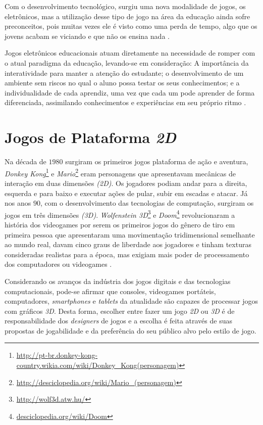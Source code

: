 Com o desenvolvimento tecnológico, surgiu uma nova modalidade de jogos, os eletrônicos, mas a utilização desse tipo de jogo na área da educação ainda sofre preconceitos, pois muitas vezes ele é visto como uma perda de tempo, algo que os jovens acabam se viciando e que não os ensina nada \cite{bib:medeiros2012}.

Jogos eletrônicos educacionais atuam diretamente na necessidade de romper com o atual paradigma da educação, levando-se em consideração: A importância da interatividade para manter a atenção do estudante; o desenvolvimento de um ambiente sem riscos no qual o aluno possa testar os seus conhecimentos; e a individualidade de cada aprendiz, uma vez que cada um pode aprender de forma diferenciada, assimilando conhecimentos e experiências em seu próprio ritmo \cite{bib:medeiros2012}.

\section{Jogos de Plataforma \textit{2D}}
\label{sec:plataforma2D}

Na década de $1980$ surgiram os primeiros jogos plataforma de ação e aventura, \textit{Donkey Kong}\footnote{\url{http://pt-br.donkey-kong-country.wikia.com/wiki/Donkey\_Kong(personagem)}} e \textit{Mario}\footnote{\url{http://desciclopedia.org/wiki/Mario\_(personagem)}} eram personagens que apresentavam mecânicas de interação em duas dimensões \textit{(2D)}. Os jogadores podiam andar para a direita, esquerda e para baixo e executar ações de pular, subir em escadas e atacar. Já nos anos $90$, com o desenvolvimento das tecnologias de computação, surgiram os jogos em três dimensões \textit{(3D)}. \textit{Wolfenstein 3D}\footnote{\url{http://wolf3d.atw.hu/}} e \textit{Doom}\footnote{\url{desciclopedia.org/wiki/Doom}} revolucionaram a história dos videogames por serem os primeiros jogos do gênero de tiro em primeira pessoa que apresentaram uma movimentação tridimensional semelhante ao mundo real, davam cinco graus de liberdade aos jogadores e tinham texturas consideradas realistas para a época, mas exigiam mais poder de processamento dos computadores ou videogames \cite{bib:lopes2016}.

Considerando os avanços da indústria dos jogos digitais e das tecnologias computacionais, pode-se afirmar que consoles, videogames portáteis, computadores, \textit{smartphones} e \textit{tablets} da atualidade são capazes de processar jogos com gráficos \textit{3D}. Desta forma, escolher entre fazer um jogo \textit{2D} ou \textit{3D} é de responsabilidade dos \textit{designers} de jogos e a escolha é feita através de suas propostas de jogabilidade e da preferência do seu público alvo pelo estilo de jogo.


